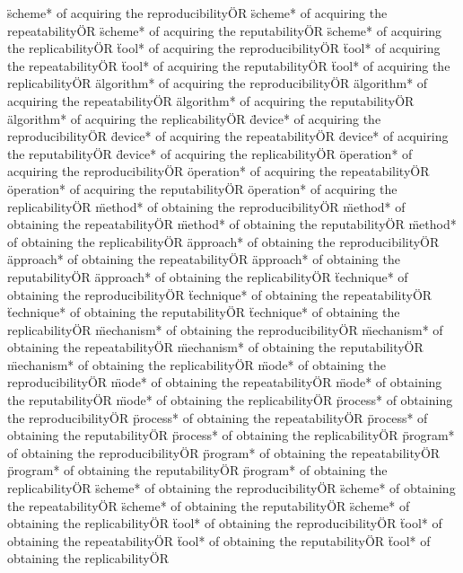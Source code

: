 \documentclass[
10pt, %
a4paper, %
oneside, %
headinclude,footinclude, %
BCOR5mm, %
]{scrartcl}
\begin{document}
\"scheme* of acquiring the reproducibility\" OR \"scheme* of acquiring the repeatability\" OR \"scheme* of acquiring the reputability\" OR \"scheme* of acquiring the replicability\" OR 
\"tool* of acquiring the reproducibility\" OR \"tool* of acquiring the repeatability\" OR \"tool* of acquiring the reputability\" OR \"tool* of acquiring the replicability\" OR 
\"algorithm* of acquiring the reproducibility\" OR \"algorithm* of acquiring the repeatability\" OR \"algorithm* of acquiring the reputability\" OR \"algorithm* of acquiring the replicability\" OR 
\"device* of acquiring the reproducibility\" OR \"device* of acquiring the repeatability\" OR \"device* of acquiring the reputability\" OR \"device* of acquiring the replicability\" OR 
\"operation* of acquiring the reproducibility\" OR \"operation* of acquiring the repeatability\" OR \"operation* of acquiring the reputability\" OR \"operation* of acquiring the replicability\" OR 
\"method* of obtaining the reproducibility\" OR \"method* of obtaining the repeatability\" OR \"method* of obtaining the reputability\" OR \"method* of obtaining the replicability\" OR 
\"approach* of obtaining the reproducibility\" OR \"approach* of obtaining the repeatability\" OR \"approach* of obtaining the reputability\" OR \"approach* of obtaining the replicability\" OR 
\"technique* of obtaining the reproducibility\" OR \"technique* of obtaining the repeatability\" OR \"technique* of obtaining the reputability\" OR \"technique* of obtaining the replicability\" OR 
\"mechanism* of obtaining the reproducibility\" OR \"mechanism* of obtaining the repeatability\" OR \"mechanism* of obtaining the reputability\" OR \"mechanism* of obtaining the replicability\" OR 
\"mode* of obtaining the reproducibility\" OR \"mode* of obtaining the repeatability\" OR \"mode* of obtaining the reputability\" OR \"mode* of obtaining the replicability\" OR 
\"process* of obtaining the reproducibility\" OR \"process* of obtaining the repeatability\" OR \"process* of obtaining the reputability\" OR \"process* of obtaining the replicability\" OR 
\"program* of obtaining the reproducibility\" OR \"program* of obtaining the repeatability\" OR \"program* of obtaining the reputability\" OR \"program* of obtaining the replicability\" OR 
\"scheme* of obtaining the reproducibility\" OR \"scheme* of obtaining the repeatability\" OR \"scheme* of obtaining the reputability\" OR \"scheme* of obtaining the replicability\" OR 
\"tool* of obtaining the reproducibility\" OR \"tool* of obtaining the repeatability\" OR \"tool* of obtaining the reputability\" OR \"tool* of obtaining the replicability\" OR 
\end{document}
